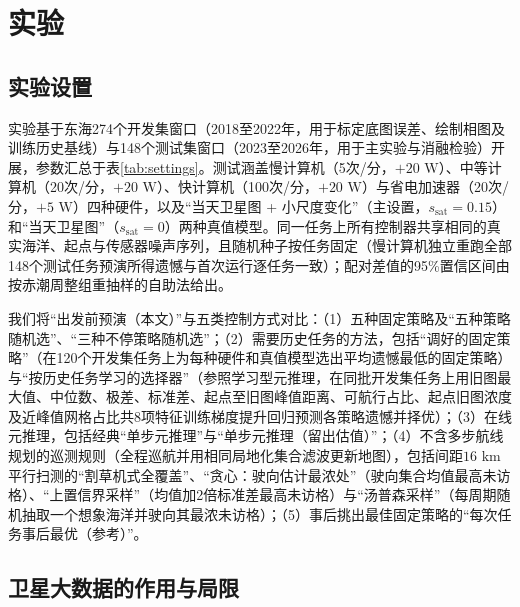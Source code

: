 \section{实验}

\subsection{实验设置}

实验基于东海274个开发集窗口（2018至2022年，用于标定底图误差、绘制相图及训练历史基线）与148个测试集窗口（2023至2026年，用于主实验与消融检验）开展，参数汇总于表\ref{tab:settings}。测试涵盖慢计算机（5次/分，$+20\text{ W}$）、中等计算机（20次/分，$+20\text{ W}$）、快计算机（100次/分，$+20\text{ W}$）与省电加速器（20次/分，$+5\text{ W}$）四种硬件，以及“当天卫星图 + 小尺度变化”（主设置，$s_{\text{sat}}=0.15$）和“当天卫星图”（$s_{\text{sat}}=0$）两种真值模型。同一任务上所有控制器共享相同的真实海洋、起点与传感器噪声序列，且随机种子按任务固定（慢计算机独立重跑全部148个测试任务预演所得遗憾与首次运行逐任务一致）；配对差值的95\%置信区间由按赤潮周整组重抽样的自助法给出。

\begin{table}[htbp]
  \centering
  \caption{东海赤潮应急巡测实验的核心参数与评价设置。}
  \label{tab:settings}
  
\end{table}

我们将“出发前预演（本文）”与五类控制方式对比：（1）五种固定策略及“五种策略随机选”、“三种不停策略随机选”；（2）需要历史任务的方法，包括“调好的固定策略”（在120个开发集任务上为每种硬件和真值模型选出平均遗憾最低的固定策略）与“按历史任务学习的选择器”（参照学习型元推理\cite{magnino2026metareasoning}，在同批开发集任务上用旧图最大值、中位数、极差、标准差、起点至旧图峰值距离、可航行占比、起点旧图浓度及近峰值网格占比共8项特征训练梯度提升回归预测各策略遗憾并择优）；（3）在线元推理，包括经典“单步元推理”\cite{russell1991right}与“单步元推理（留出估值）”；（4）不含多步航线规划的巡测规则（全程巡航并用相同局地化集合滤波更新地图），包括间距$16\text{ km}$平行扫测的“割草机式全覆盖”\cite{galceran2013coverage}、“贪心：驶向估计最浓处”（驶向集合均值最高未访格）、“上置信界采样”（均值加2倍标准差最高未访格）\cite{srinivas2012gpucb}与“汤普森采样”（每周期随机抽取一个想象海洋并驶向其最浓未访格）\cite{russo2018thompson}；（5）事后挑出最佳固定策略的“每次任务事后最优（参考）”。

\subsection{卫星大数据的作用与局限}

